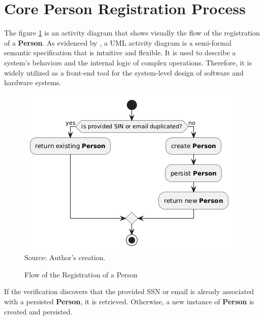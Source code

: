 \section{Core Person Registration Process}
\label{core_person_registration_process}

The figure \ref{fig:person_registration_flow} is an activity diagram that shows visually the flow of the registration of a \textbf{Person}. As evidenced by \cite{alfedaghi2021validationconceptualversusactivity}, a UML activity diagram is a semi-formal semantic specification that is intuitive and flexible. It is used to describe a system's behaviors and the internal logic of complex operations. Therefore, it is widely utilized as a front-end tool for the system-level design of software and hardware systems. 

\begin{figure}[HContext]
    \centering
    \caption{Flow of the Registration of a Person}
    \includegraphics[width=1\linewidthContext]
    {figures/person_registration_activity_diagram.png}
    \label{fig:person_registration_flow}
    \footnotesize Source: Author's creation.
\end{figure}

If the verification discovers that the provided SSN or email is already associated with a persisted \textbf{Person}, it is retrieved. Otherwise, a new instance of \textbf{Person} is created and persisted.